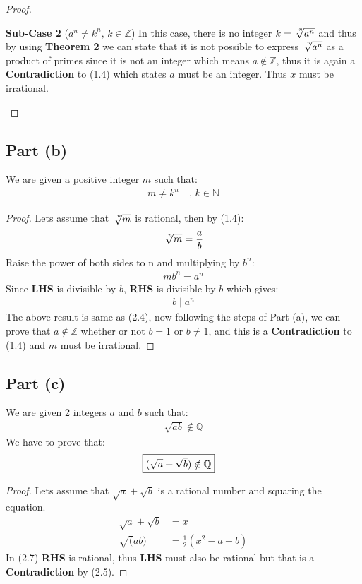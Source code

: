 \documentclass{article}
\newenvironment{myenv}{\begin{adjustwidth}{1cm}{}}{\end{adjustwidth}}
\begin{document}
{{\begin{proof}
\begin{myenv}
        \textbf{Sub-Case 2} ($a^n \ne k^n ,\, k \in \mathbb{Z}$) \quad In this case, there is no integer $k=\sqrt[\leftroot{-3}\uproot{3}n]{a^n}$ and thus by using \textbf{Theorem 2} we can state that it is not possible to express $\sqrt[\leftroot{-3}\uproot{3}n]{a^n}$ as a product of primes since it is not an integer which means $a \notin \mathbb{Z}$, thus it is again a \textbf{Contradiction} to (1.4) which states $a$ must be an integer. Thus $x$ must be irrational. \newline
      \end{myenv}
    \end{proof}
  }
  \subsection{Part (b)}{
    We are given a positive integer $m$ such that:
    \begin{align*}
      m \ne k^n \quad,\, k \in \mathbb{N}
    \end{align*}
    \begin{proof}
    Lets assume that $\sqrt[\leftroot{-3}\uproot{3}n]{m}$ is rational, then by (1.4):
    \begin{align*}
      \sqrt[\leftroot{-3}\uproot{3}n]{m}=\frac{a}{b}
    \end{align*}
    Raise the power of both sides to n and multiplying by $b^n$:
    \begin{align*}
      mb^n=a^n
    \end{align*}
    Since \textbf{LHS} is divisible by $b$, \textbf{RHS} is divisible by $b$ which gives:
    \begin{align*}
      b \mid a^n
    \end{align*}
    The above result is same as (2.4), now following the steps of Part (a), we can prove that $a\notin\mathbb{Z}$ whether or not $b=1$ or $b\ne1$, and this is a \textbf{Contradiction} to (1.4) and $m$ must be irrational. \newline
    \end{proof}
  }
  \subsection{Part (c)}{
    We are given 2 integers $a$ and $b$ such that:
    \begin{align}
      \sqrt{ab} \notin \mathbb{Q} \label{eq:5}
    \end{align}
    We have to prove that:
    \begin{align}
      \Aboxed{(\sqrt{a}+\sqrt{b}) \notin \mathbb{Q}} \label{eq:6}
    \end{align}
    \begin{proof}
    Lets assume that $\sqrt{a}+\sqrt{b}$ is a rational number and squaring the equation.
    \begin{align}
      \sqrt{a}+\sqrt{b}&=x \\ \label{eq:7}
      \sqrt(ab)&=\frac{1}{2}(x^2-a-b) 
    \end{align}
    In (2.7) \textbf{RHS} is rational, thus \textbf{LHS} must also be rational but that is a \textbf{Contradiction} by (2.5). \newline
  \end{proof}
  }
}
\end{document}
